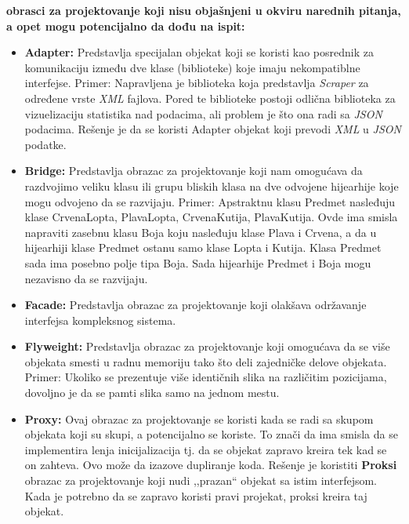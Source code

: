 \documentclass[a4paper]{article}
\begin{document}
  \textbf{obrasci za projektovanje koji nisu objašnjeni u okviru narednih pitanja, a opet mogu potencijalno da
          dođu na ispit:}
  \begin{itemize}
    \item \textbf{Adapter:} Predstavlja specijalan objekat koji se koristi kao posrednik 
          za komunikaciju između dve klase (biblioteke) koje 
          imaju nekompatiblne interfejse. Primer: Napravljena
          je biblioteka koja predstavlja \textit{Scraper} za određene vrste \textit{XML} fajlova. Pored te biblioteke 
          postoji odlična biblioteka za vizuelizaciju statistika nad podacima, ali problem je što ona radi sa 
          \textit{JSON} podacima. Rešenje je da se koristi Adapter objekat koji prevodi \textit{XML} u \textit{JSON}
          podatke.
    \item \textbf{Bridge:} Predstavlja obrazac za projektovanje koji nam omogućava da razdvojimo veliku klasu
          ili grupu bliskih klasa na dve odvojene hijearhije koje mogu odvojeno da se razvijaju. Primer:
          Apstraktnu klasu Predmet nasleđuju klase CrvenaLopta, PlavaLopta, CrvenaKutija, PlavaKutija. Ovde ima 
          smisla napraviti zasebnu klasu Boja koju nasleđuju klase Plava i Crvena, a da u hijearhiji klase Predmet
          ostanu samo klase Lopta i Kutija. Klasa Predmet sada ima posebno polje tipa Boja. Sada hijearhije 
          Predmet i Boja mogu nezavisno da se razvijaju.
    \item \textbf{Facade:} Predstavlja obrazac za projektovanje koji olakšava održavanje interfejsa kompleksnog sistema.
    \item \textbf{Flyweight:} Predstavlja obrazac za projektovanje koji omogućava da se više objekata smesti u radnu 
          memoriju tako što deli zajedničke delove objekata. Primer: Ukoliko se prezentuje više identičnih slika
          na različitim pozicijama, dovoljno je da se pamti slika samo na jednom mestu.
    \item \textbf{Proxy:} Ovaj obrazac za projektovanje se koristi kada se radi sa skupom objekata koji su skupi,
          a potencijalno se koriste. To znači da ima smisla da se implementira lenja inicijalizacija tj. 
          da se objekat zapravo kreira tek kad se on zahteva. Ovo može da izazove dupliranje koda. Rešenje je 
          koristiti \textbf{Proksi} obrazac za projektovanje koji nudi ,,prazan`` objekat sa istim interfejsom.
          Kada je potrebno da se zapravo koristi pravi projekat, proksi kreira taj objekat.
  \end{itemize}
\end{document}
